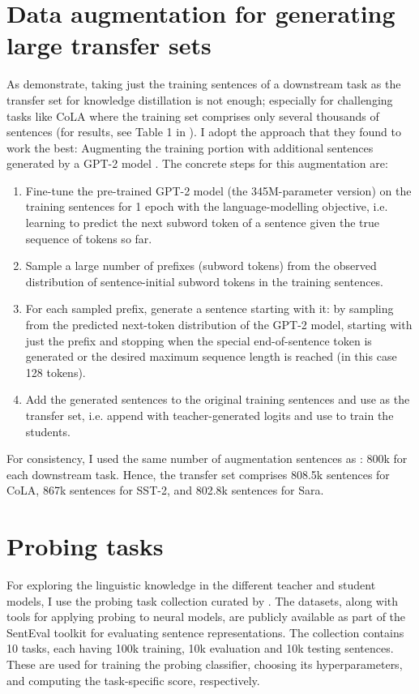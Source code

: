 \documentclass[bsc,frontabs,twoside,singlespacing,parskip,deptreport]{infthesis}
\begin{document}
{  \section{Data augmentation for generating large transfer sets}{
    As \citet{Tang_2019a} demonstrate, taking just the training sentences of a downstream task as the transfer set for knowledge distillation is not enough; especially for challenging tasks like CoLA where the training set comprises only several thousands of sentences (for results, see Table 1 in \citet{Tang_2019b}). I adopt the approach that they found to work the best: Augmenting the training portion with additional sentences generated by a GPT-2 model \citep{Radford_2019}. The concrete steps for this augmentation are:
    \begin{enumerate}
      \item Fine-tune the pre-trained GPT-2 model (the 345M-parameter version) on the training sentences for 1 epoch with the language-modelling objective, i.e. learning to predict the next subword token of a sentence given the true sequence of tokens so far.
      \item Sample a large number of prefixes (subword tokens) from the observed distribution of sentence-initial subword tokens in the training sentences.
      \item For each sampled prefix, generate a sentence starting with it: by sampling from the predicted next-token distribution of the GPT-2 model, starting with just the prefix and stopping when the special end-of-sentence token is generated or the desired maximum sequence length is reached (in this case 128 tokens).
      \item Add the generated sentences to the original training sentences and use as the transfer set, i.e. append with teacher-generated logits and use to train the students.
    \end{enumerate}

    For consistency, I used the same number of augmentation sentences as \citet{Tang_2019a}: 800k for each downstream task. Hence, the transfer set comprises 808.5k sentences for CoLA, 867k sentences for SST-2, and 802.8k sentences for Sara.
  }

  \section{Probing tasks}{
    For exploring the linguistic knowledge in the different teacher and student models, I use the probing task collection curated by \citet{Conneau_2018}.
    The datasets, along with tools for applying probing to neural models, are publicly available as part of the SentEval toolkit \citet{SentEval-paper} for evaluating sentence representations.
    The collection contains 10 tasks, each having 100k training, 10k evaluation and 10k testing sentences. These are used for training the probing classifier, choosing its hyperparameters, and computing the task-specific score, respectively.

}}
\end{document}
